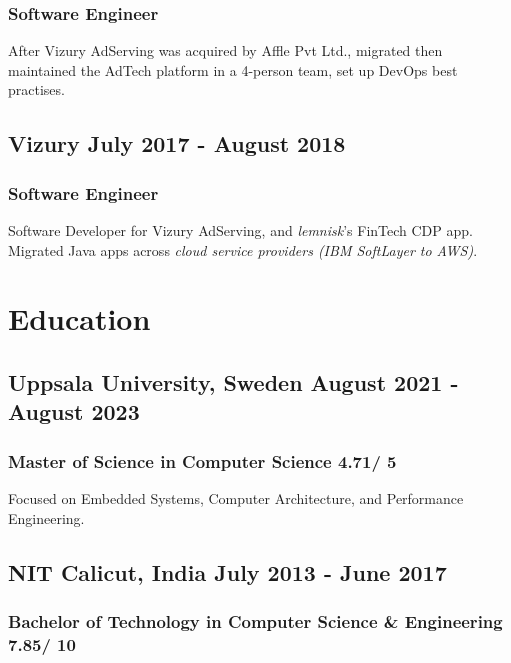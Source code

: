 \documentclass[12pt]{scrartcl}
\newcommand{\hll}[1]{{\color{RawSienna}#1}}
\newcommand{\hlp}[1]{{\color{Maroon}#1}}
\begin{document}
\subsubsection{Software Engineer}

After Vizury AdServing was acquired by Affle Pvt Ltd., migrated then maintained the AdTech platform in a 4-person team, set up \hlp{DevOps} best practises.

\subsection[Vizury]{Vizury \hfill July 2017 - August 2018}

\subsubsection{Software Engineer}

Software Developer for Vizury AdServing, and \textit{lemnisk}'s FinTech CDP app. Migrated \hll{Java} apps across \textit{cloud service providers (IBM SoftLayer to AWS)}.

\section{Education}

\subsection[Uppsala Universitet]{Uppsala University, Sweden \hfill August 2021 - August 2023}

\subsubsection{Master of Science in Computer Science \hfill {\color{lightgray} 4.71/ 5}}

Focused on Embedded Systems, Computer Architecture, and Performance Engineering.

\subsection[NITC]{NIT Calicut, India \hfill July 2013 - June 2017}

\subsubsection{Bachelor of Technology in Computer Science \& Engineering \hfill {\color{lightgray} 7.85/ 10}}
\end{document}
